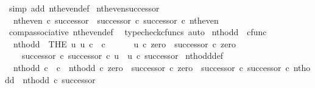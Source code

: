 \begin{isabellebody}
\ {\isacharparenleft}{\kern0pt}simp\ add{\isacharcolon}{\kern0pt}\ nth{\isacharunderscore}{\kern0pt}even{\isacharunderscore}{\kern0pt}def{}{\isacharparenright}{\kern0pt}%
\endisatagproof
{\isafoldproof}%
%
\isadelimproof
\isanewline
%
\endisadelimproof
\isanewline
{}\isamarkupfalse%
\ nth{\isacharunderscore}{\kern0pt}even{\isacharunderscore}{\kern0pt}successor{}{\isacharcolon}{\kern0pt}\isanewline
\ \ {\isachardoublequoteopen}nth{\isacharunderscore}{\kern0pt}even\ {\isasymcirc}\isactrlsub c\ successor\ {\isacharequal}{\kern0pt}\ successor\ {\isasymcirc}\isactrlsub c\ successor\ {\isasymcirc}\isactrlsub c\ nth{\isacharunderscore}{\kern0pt}even{\isachardoublequoteclose}\isanewline
%
\isadelimproof
\ \ %
\endisadelimproof
%
\isatagproof
{}\isamarkupfalse%
\ comp{\isacharunderscore}{\kern0pt}associative{}\ nth{\isacharunderscore}{\kern0pt}even{\isacharunderscore}{\kern0pt}def{}\ \isamarkupfalse%
\ {\isacharparenleft}{\kern0pt}typecheck{\isacharunderscore}{\kern0pt}cfuncs{\isacharcomma}{\kern0pt}\ auto{\isacharparenright}{\kern0pt}%
\endisatagproof
{\isafoldproof}%
%
\isadelimproof
%
\endisadelimproof
%
\isadelimdocument
%
\endisadelimdocument
%
\isatagdocument
%
\isamarkuptrue%
%
\endisatagdocument
{\isafolddocument}%
%
\isadelimdocument
%
\endisadelimdocument
{}\isamarkupfalse%
\ nth{\isacharunderscore}{\kern0pt}odd\ {\isacharcolon}{\kern0pt}{\isacharcolon}{\kern0pt}\ {\isachardoublequoteopen}cfunc{\isachardoublequoteclose}\ \isanewline
\ \ {\isachardoublequoteopen}nth{\isacharunderscore}{\kern0pt}odd\ {\isacharequal}{\kern0pt}\ {\isacharparenleft}{\kern0pt}THE\ u{\isachardot}{\kern0pt}\ u{\isacharcolon}{\kern0pt}\ {\isasymnat}\isactrlsub c\ {\isasymrightarrow}\ {\isasymnat}\isactrlsub c\ {\isasymand}\ \isanewline
\ \ \ \ u\ {\isasymcirc}\isactrlsub c\ zero\ {\isacharequal}{\kern0pt}\ successor\ {\isasymcirc}\isactrlsub c\ zero\ {\isasymand}\isanewline
\ \ \ \ {\isacharparenleft}{\kern0pt}successor\ {\isasymcirc}\isactrlsub c\ successor{\isacharparenright}{\kern0pt}\ {\isasymcirc}\isactrlsub c\ u\ {\isacharequal}{\kern0pt}\ u\ {\isasymcirc}\isactrlsub c\ successor{\isacharparenright}{\kern0pt}{\isachardoublequoteclose}\isanewline
\isanewline
{}\isamarkupfalse%
\ nth{\isacharunderscore}{\kern0pt}odd{\isacharunderscore}{\kern0pt}def{}{\isacharcolon}{\kern0pt}\isanewline
\ \ {\isachardoublequoteopen}nth{\isacharunderscore}{\kern0pt}odd{\isacharcolon}{\kern0pt}\ {\isasymnat}\isactrlsub c\ {\isasymrightarrow}\ {\isasymnat}\isactrlsub c\ {\isasymand}\ nth{\isacharunderscore}{\kern0pt}odd\ {\isasymcirc}\isactrlsub c\ zero\ {\isacharequal}{\kern0pt}\ successor\ {\isasymcirc}\isactrlsub c\ zero\ {\isasymand}\ {\isacharparenleft}{\kern0pt}successor\ {\isasymcirc}\isactrlsub c\ successor{\isacharparenright}{\kern0pt}\ {\isasymcirc}\isactrlsub c\ nth{\isacharunderscore}{\kern0pt}odd\ {\isacharequal}{\kern0pt}\ nth{\isacharunderscore}{\kern0pt}odd\ {\isasymcirc}\isactrlsub c\ successor{\isachardoublequoteclose}\isanewline

\end{isabellebody}
